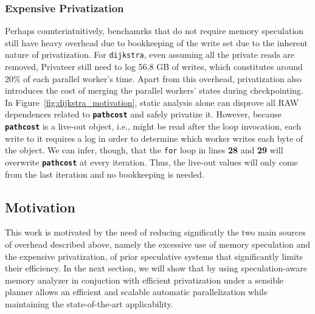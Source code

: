 \subsubsection{Expensive Privatization}
\label{sec:excessive-priv}
Perhaps counterintuitively, benchamrks that do not require memory
speculation still have heavy overhead due to bookkeeping of the write set
due to the inherent nature of privatization. For \texttt{dijkstra}, even
assuming all the private reads are removed, Privateer still need to log
56.8 GB of writes, which constitutes around 20\% of each parallel worker's
time. Apart from this overhead, privatization also introduces the cost of
merging the parallel workers' states during checkpointing. In
Figure~\ref{fig:dijkstra_motivation}, static analysis alone can disprove
all RAW dependences related to \texttt{\textbf{pathcost}} and safely
privatize it. However, because \texttt{\textbf{pathcost}} is a live-out
object, i.e., might be read after the loop invocation, each write to it
requires a log in order to determine which worker writes each byte of the
object. We can infer, though, that the \texttt{for} loop in lines
\textbf{28} and \textbf{29} will overwrite \texttt{\textbf{pathcost}} at
every iteration. Thus, the live-out values will only come from the last
iteration and no bookkeeping is needed.

\subsection{Motivation}
This work is motivated by the need of reducing significatly the two main
sources of overhead described above, namely the excessive use of memory
speculation and the expensive privatization, of prior speculative systems
that significantly limits their efficiency.
%
In the next section, we will show that by using speculation-aware memory
analyzer in conjuction with efficient privatization under a sensible
planner allows an efficient and scalable automatic parallelization while
maintaining the state-of-the-art applicability.



